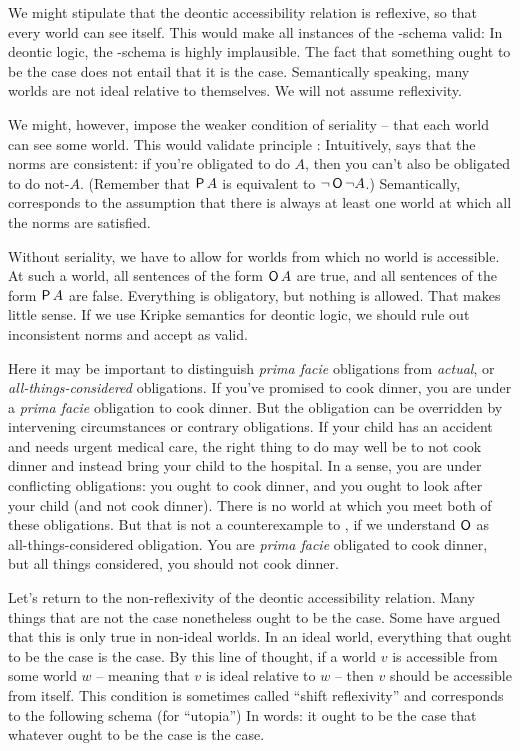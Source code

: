 We might stipulate that the deontic accessibility relation is reflexive, so that
every world can see itself. This would make all instances of the -schema
valid:
%
%
In deontic logic, the -schema is highly implausible. The fact that
something ought to be the case does not entail that it is the case. Semantically
speaking, many worlds are not ideal relative to themselves. We will not assume
reflexivity.

We might, however, impose the weaker condition of seriality -- that each world
can see some world. This would validate principle :
%
%
Intuitively,  says that the norms are consistent: if you're obligated to
do $A$, then you can't also be obligated to do not-$A$. (Remember that $\operatorname{\mathsf{P}} A$
is equivalent to $\neg \operatorname{\mathsf{O}} \neg A$.) Semantically,  corresponds to the
assumption that there is always at least one world at which all the norms are
satisfied.

Without seriality, we have to allow for worlds from which no world is
accessible. At such a world, all sentences of the form $\operatorname{\mathsf{O}} A$ are true, and all
sentences of the form $\operatorname{\mathsf{P}} A$ are false. Everything is obligatory, but nothing
is allowed. That makes little sense. If we use Kripke semantics for deontic
logic, we should rule out inconsistent norms and accept  as valid.

Here it may be important to distinguish \emph{prima facie} obligations from
\emph{actual}, or \emph{all-things-considered} obligations. If you've promised
to cook dinner, you are under a \emph{prima facie} obligation to cook dinner.
But the obligation can be overridden by intervening circumstances or contrary
obligations. If your child has an accident and needs urgent medical care, the
right thing to do may well be to not cook dinner and instead bring your child to
the hospital. In a sense, you are under conflicting obligations: you ought to
cook dinner, and you ought to look after your child (and not cook dinner). There
is no world at which you meet both of these obligations. But that is not a
counterexample to , if we understand $\operatorname{\mathsf{O}}$ as all-things-considered
obligation. You are \emph{prima facie} obligated to cook dinner, but all things
considered, you should not cook dinner.

Let's return to the non-reflexivity of the deontic accessibility relation. Many
things that are not the case nonetheless ought to be the case. Some have argued
that this is only true in non-ideal worlds. In an ideal world, everything that
ought to be the case is the case. By this line of thought, if a world $v$ is
accessible from some world $w$ -- meaning that $v$ is ideal relative to $w$ --
then $v$ should be accessible from itself. This condition is sometimes called
``shift reflexivity'' and corresponds to the following schema  (for
``utopia'')
%
%
In words: it ought to be the case that whatever ought to be the case is the
case.

